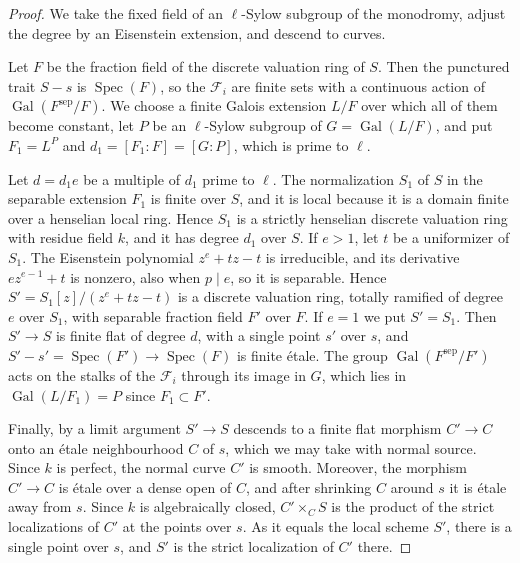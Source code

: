 \documentclass[11pt]{article}
\begin{document}
\begin{proof}[{Proof}]\label{bp264}%
We take the fixed field of an \(\ell\)-Sylow subgroup of the monodromy, adjust the degree by an Eisenstein extension, and descend to curves.

Let \(F\) be the fraction field of the discrete valuation ring of \(S\). Then the punctured trait \(S-s\) is \(\operatorname{Spec}(F)\), so the \(\mathcal F_i\) are finite sets with a continuous action of \(\operatorname{Gal}(F^{\mathrm{sep}}/F)\). We choose a finite Galois extension \(L/F\) over which all of them become constant, let \(P\) be an \(\ell\)-Sylow subgroup of \(G=\operatorname{Gal}(L/F)\), and put \(F_1=L^P\) and \(d_1=[F_1:F]=[G:P]\), which is prime to \(\ell\).

Let \(d=d_1e\) be a multiple of \(d_1\) prime to \(\ell\). The normalization \(S_1\) of \(S\) in the separable extension \(F_1\) is finite over \(S\), and it is local because it is a domain finite over a henselian local ring. Hence \(S_1\) is a strictly henselian discrete valuation ring with residue field \(k\), and it has degree \(d_1\) over \(S\). If \(e>1\), let \(t\) be a uniformizer of \(S_1\). The Eisenstein polynomial \(z^e+tz-t\) is irreducible, and its derivative \(ez^{e-1}+t\) is nonzero, also when \(p\mid e\), so it is separable. Hence \(S'=S_1[z]/(z^e+tz-t)\) is a discrete valuation ring, totally ramified of degree \(e\) over \(S_1\), with separable fraction field \(F'\) over \(F\). If \(e=1\) we put \(S'=S_1\). Then \(S'\to S\) is finite flat of degree \(d\), with a single point \(s'\) over \(s\), and \(S'-s'=\operatorname{Spec}(F')\to
\operatorname{Spec}(F)\) is finite étale. The group \(\operatorname{Gal}(F^{\mathrm{sep}}/F')\) acts on the stalks of the \(\mathcal F_i\) through its image in \(G\), which lies in \(\operatorname{Gal}(L/F_1)=P\) since \(F_1\subset F'\).

Finally, by a limit argument \(S'\to S\) descends to a finite flat morphism \(C'\to C\) onto an étale neighbourhood \(C\) of \(s\), which we may take with normal source. Since \(k\) is perfect, the normal curve \(C'\) is smooth. Moreover, the morphism \(C'\to C\) is étale over a dense open of \(C\), and after shrinking \(C\) around \(s\) it is étale away from \(s\). Since \(k\) is algebraically closed, \(C'\times_CS\) is the product of the strict localizations of \(C'\) at the points over \(s\). As it equals the local scheme \(S'\), there is a single point over \(s\), and \(S'\) is the strict localization of \(C'\) there.
\end{proof}
\end{document}
